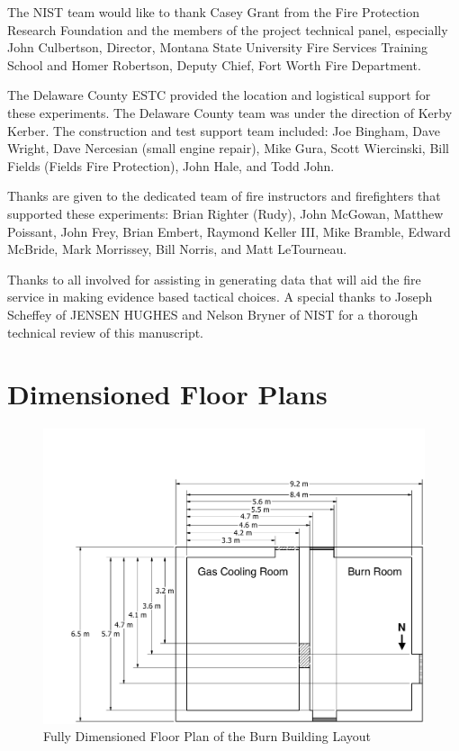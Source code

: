 \documentclass[12pt,oneside]{book}
\begin{document}
The NIST team would like to thank Casey Grant from the Fire Protection Research Foundation and the members of the project technical panel, especially John Culbertson, Director, Montana State University Fire Services Training School and Homer Robertson, Deputy Chief, Fort Worth Fire Department.  

The Delaware County ESTC provided the location and logistical support for these experiments. The Delaware County team was under the direction of Kerby Kerber. The construction and test support team included: Joe Bingham, Dave Wright, Dave Nercesian (small engine repair), Mike Gura, Scott Wiercinski, Bill Fields (Fields Fire Protection), John Hale, and Todd John.

Thanks are given to the dedicated team of fire instructors and firefighters that supported these experiments: Brian Righter (Rudy), John McGowan, Matthew Poissant, John Frey, Brian Embert, Raymond Keller III, Mike Bramble, Edward McBride, Mark Morrissey, Bill Norris, and Matt LeTourneau.

Thanks to all involved for assisting in generating data that will aid the fire service in making evidence based tactical choices. A special thanks to Joseph Scheffey of JENSEN HUGHES and Nelson Bryner of NIST for a thorough technical review of this manuscript.



\appendix

\chapter{Dimensioned Floor Plans}
\label{app:floor_plans}

\begin{figure}[!ht]
	\includegraphics[width=\columnwidth]{../Figures/Floor_Plans/PDFs/West_Structure/DelCo_2012_West_Structure_Detailed}
	\caption{Fully Dimensioned Floor Plan of the Burn Building Layout}
	\label{fig:Delaware_County,_PA_Burn_Building_Layout_Detailed}
\end{figure}
\end{document}
